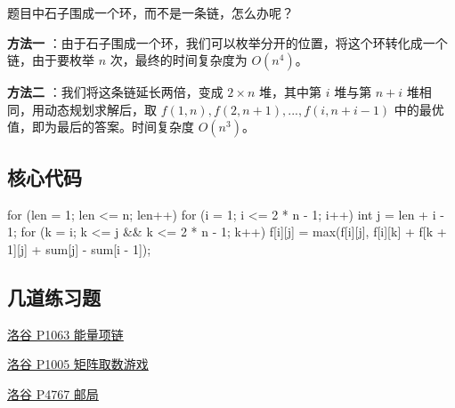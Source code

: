 题目中石子围成一个环，而不是一条链，怎么办呢？

\textbf{ 方法一 } ：由于石子围成一个环，我们可以枚举分开的位置，将这个环转化成一个链，由于要枚举 $n$ 次，最终的时间复杂度为 $O(n^4)$。

\textbf{ 方法二 } ：我们将这条链延长两倍，变成 $2\times n$ 堆，其中第 $i$ 堆与第 $n+i$ 堆相同，用动态规划求解后，取 $f(1,n),f(2,n+1),...,f(i,n+i-1)$ 中的最优值，即为最后的答案。时间复杂度 $O(n^3)$。

\subsection{核心代码}

\begin{cppcode}
for (len = 1; len <= n; len++)
  for (i = 1; i <= 2 * n - 1; i++) {
    int j = len + i - 1;
    for (k = i; k <= j && k <= 2 * n - 1; k++)
      f[i][j] = max(f[i][j], f[i][k] + f[k + 1][j] + sum[j] - sum[i - 1]);
  }
\end{cppcode}

\subsection{几道练习题}

\href{https://www.luogu.org/problemnew/show/P1063}{洛谷 P1063 能量项链}

\href{https://www.luogu.org/problemnew/show/P1005}{洛谷 P1005 矩阵取数游戏}

\href{https://www.luogu.org/problemnew/show/P4767}{洛谷 P4767 邮局}
